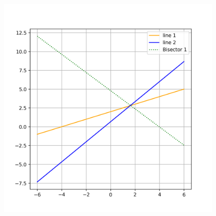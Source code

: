 \documentclass[journal]{IEEEtran}
\begin{document}
\begin{figure}
    \centering
    \includegraphics[width=\columnwidth]{figs/figure.png}
    \caption{}
    \label{fig:placeholder}
\end{figure}
\end{document}
